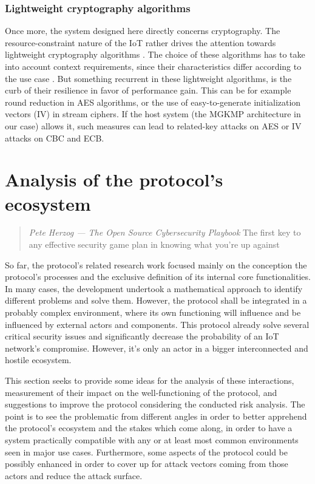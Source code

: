 \subsubsection{Lightweight cryptography algorithms}

Once more, the system designed here directly concerns cryptography. The resource-constraint nature of the IoT rather drives the attention towards lightweight cryptography algorithms \cite{bhardwaj_review_2017, surendran_survey_2018}. The choice of these algorithms has to take into account context requirements, since their characteristics differ according to the use case \cite{muthavhine_analysis_2018}. But something recurrent in these lightweight algorithms, is the curb of their resilience in favor of performance gain. This can be for example round reduction in AES algorithms, or the use of easy-to-generate initialization vectors (IV) in stream ciphers. If the host system (the MGKMP architecture in our case) allows it, such measures can lead to related-key attacks on AES \cite{hutchison_key_2010, hutchison_related-key_2009} or IV attacks on CBC and ECB.

\section{Analysis of the protocol's ecosystem}
\label{sec:ecosystem}

\begin{quote}{\emph{Pete Herzog --- The Open Source Cybersecurity Playbook}}
	The first key to any effective security game plan in knowing what you’re up against
\end{quote}

So far, the protocol’s related research work focused mainly on the conception the protocol’s processes and the exclusive definition of its internal core functionalities. In many cases, the development undertook a mathematical approach to identify different problems and solve them. However, the protocol shall be integrated in a probably complex environment, where its own functioning will influence and be influenced by external actors and components. This protocol already solve several critical security issues and significantly decrease the probability of an IoT network’s compromise. However, it’s only an actor in a bigger interconnected and hostile ecosystem.

This section seeks to provide some ideas for the analysis of these interactions, measurement of their impact on the well-functioning of the protocol, and suggestions to improve the protocol considering the conducted risk analysis. The point is to see the problematic from different angles in order to better apprehend the protocol’s ecosystem and the stakes which come along, in order to have a system practically compatible with any or at least most common environments seen in major use cases. Furthermore, some aspects of the protocol could be possibly enhanced in order to cover up for attack vectors coming from those actors and reduce the attack surface.

